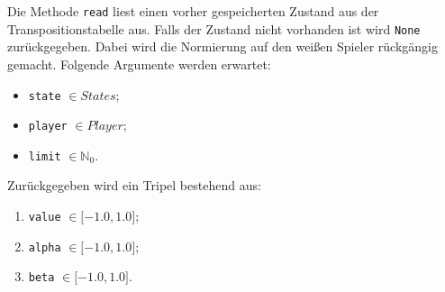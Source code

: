 \documentclass[11pt]{article}
\providecommand{\tightlist}{%
      \setlength{\itemsep}{0pt}\setlength{\parskip}{0pt}}
\begin{document}
    Die Methode \texttt{read} liest einen vorher gespeicherten Zustand aus
der Transpositionstabelle aus. Falls der Zustand nicht vorhanden ist
wird \texttt{None} zurückgegeben. Dabei wird die Normierung auf den
weißen Spieler rückgängig gemacht. Folgende Argumente werden erwartet:

\begin{itemize}
    \tightlist
    \item \texttt{state} \(\in States\);
    \item \texttt{player} \(\in Player\);
    \item \texttt{limit} \(\in \mathbb{N}_0\).
\end{itemize}

Zurückgegeben wird ein Tripel bestehend aus:

\begin{enumerate}
    \tightlist
    \item \texttt{value} \(\in \mathopen[-1.0,1.0\mathclose]\);
    \item \texttt{alpha} \(\in \mathopen[-1.0,1.0\mathclose]\);
    \item \texttt{beta} \(\in \mathopen[-1.0,1.0\mathclose]\).
\end{enumerate}
\end{document}

